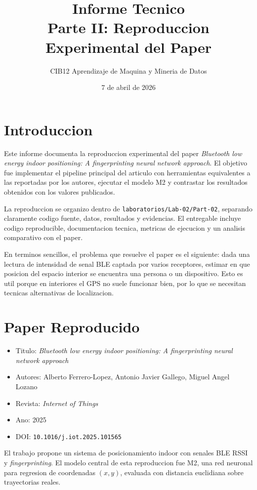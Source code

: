 \documentclass[11pt,a4paper]{article}
\title{Informe Tecnico\\Parte II: Reproduccion Experimental del Paper}
\author{CIB12 Aprendizaje de Maquina y Mineria de Datos}
\date{7 de abril de 2026}
\begin{document}
\maketitle

\section{Introduccion}
Este informe documenta la reproduccion experimental del paper \textit{Bluetooth low energy indoor positioning: A fingerprinting neural network approach}. El objetivo fue implementar el pipeline principal del articulo con herramientas equivalentes a las reportadas por los autores, ejecutar el modelo M2 y contrastar los resultados obtenidos con los valores publicados.

La reproduccion se organizo dentro de \texttt{laboratorios/Lab-02/Part-02}, separando claramente codigo fuente, datos, resultados y evidencias. El entregable incluye codigo reproducible, documentacion tecnica, metricas de ejecucion y un analisis comparativo con el paper.

En terminos sencillos, el problema que resuelve el paper es el siguiente: dada una lectura de intensidad de senal BLE captada por varios receptores, estimar en que posicion del espacio interior se encuentra una persona o un dispositivo. Esto es util porque en interiores el GPS no suele funcionar bien, por lo que se necesitan tecnicas alternativas de localizacion.

\section{Paper Reproducido}
\begin{itemize}
\item Titulo: \textit{Bluetooth low energy indoor positioning: A fingerprinting neural network approach}
\item Autores: Alberto Ferrero-Lopez, Antonio Javier Gallego, Miguel Angel Lozano
\item Revista: \textit{Internet of Things}
\item Ano: 2025
\item DOI: \texttt{10.1016/j.iot.2025.101565}
\end{itemize}

El trabajo propone un sistema de posicionamiento indoor con senales BLE RSSI y \textit{fingerprinting}. El modelo central de esta reproduccion fue M2, una red neuronal para regresion de coordenadas $(x,y)$, evaluada con distancia euclidiana sobre trayectorias reales.
\end{document}
